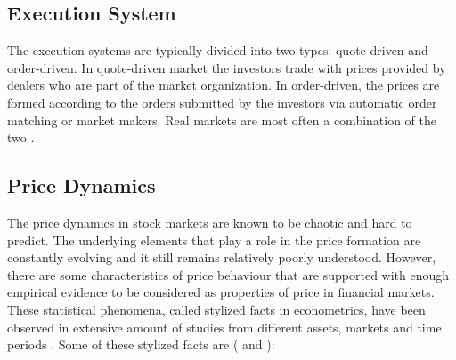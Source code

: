 
\subsection{Execution System}
The execution systems are typically divided into two types:
quote-driven and order-driven. In quote-driven market the investors
trade with prices provided by dealers who are part of the market 
organization. In order-driven, the prices are formed according to
the orders submitted by the investors via automatic order matching 
or market makers. \citep{Baru17} Real markets are most often a combination
of the two \citep{boer05}.

\subsection{Price Dynamics}
The price dynamics in stock markets are known to be chaotic and hard to 
predict. The underlying elements that play a role in the price formation
are constantly evolving and it still remains relatively poorly understood.
However, there are some characteristics of price behaviour that are supported
with enough empirical evidence to be considered as properties of price in
financial markets. These statistical phenomena, called stylized facts in
econometrics, have been observed in extensive amount of studies from 
different assets, markets and time periods \citep{Shakeel18}. 
Some of these stylized facts are (\citet{StylizedFacts01} and \citet{lob13}):

